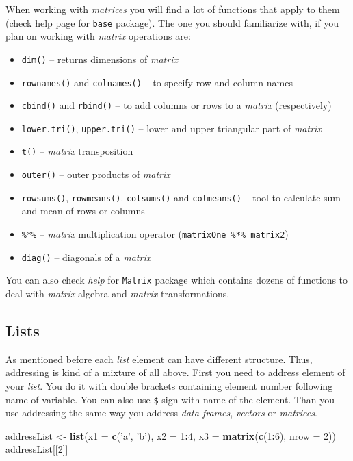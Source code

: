 \documentclass[]{book}
\newenvironment{Shaded}{\begin{snugshade}}{\end{snugshade}}
\newcommand{\KeywordTok}[1]{\textcolor[rgb]{0.13,0.29,0.53}{\textbf{#1}}}
\newcommand{\DataTypeTok}[1]{\textcolor[rgb]{0.13,0.29,0.53}{#1}}
\newcommand{\DecValTok}[1]{\textcolor[rgb]{0.00,0.00,0.81}{#1}}
\newcommand{\StringTok}[1]{\textcolor[rgb]{0.31,0.60,0.02}{#1}}
\newcommand{\OperatorTok}[1]{\textcolor[rgb]{0.81,0.36,0.00}{\textbf{#1}}}
\newcommand{\NormalTok}[1]{#1}
\providecommand{\tightlist}{%
  \setlength{\itemsep}{0pt}\setlength{\parskip}{0pt}}
\theoremstyle{definition}
\theoremstyle{definition}
\theoremstyle{definition}
\theoremstyle{remark}
\begin{document}
When working with \emph{matrices} you will find a lot of functions that
apply to them (check help page for \texttt{base} package). The one you
should familiarize with, if you plan on working with \emph{matrix}
operations are:

\begin{itemize}
\tightlist
\item
  \texttt{dim()} -- returns dimensions of \emph{matrix}
\item
  \texttt{rownames()} and \texttt{colnames()} -- to specify row and
  column names
\item
  \texttt{cbind()} and \texttt{rbind()} -- to add columns or rows to a
  \emph{matrix} (respectively)
\item
  \texttt{lower.tri()}, \texttt{upper.tri()} -- lower and upper
  triangular part of \emph{matrix}
\item
  \texttt{t()} -- \emph{matrix} transposition
\item
  \texttt{outer()} -- outer products of \emph{matrix}
\item
  \texttt{rowsums()}, \texttt{rowmeans()}. \texttt{colsums()} and
  \texttt{colmeans()} -- tool to calculate sum and mean of rows or
  columns
\item
  \texttt{\%*\%} -- \emph{matrix} multiplication operator
  (\texttt{matrixOne\ \%*\%\ matrix2})
\item
  \texttt{diag()} -- diagonals of a \emph{matrix}
\end{itemize}

You can also check \emph{help} for \texttt{Matrix} package which
contains dozens of functions to deal with \emph{matrix} algebra and
\emph{matrix} transformations.

\subsection{Lists}\label{lists}

As mentioned before each \emph{list} element can have different
structure. Thus, addressing is kind of a mixture of all above. First you
need to address element of your \emph{list}. You do it with double
brackets containing element number following name of variable. You can
also use \texttt{\$} sign with name of the element. Than you use
addressing the same way you address \emph{data frames}, \emph{vectors}
or \emph{matrices}.

\begin{Shaded}
\begin{Highlighting}[]
\NormalTok{addressList <-}\StringTok{ }\KeywordTok{list}\NormalTok{(}\DataTypeTok{x1 =} \KeywordTok{c}\NormalTok{(}\StringTok{'a'}\NormalTok{, }\StringTok{'b'}\NormalTok{), }\DataTypeTok{x2 =} \DecValTok{1}\OperatorTok{:}\DecValTok{4}\NormalTok{, }\DataTypeTok{x3 =} \KeywordTok{matrix}\NormalTok{(}\KeywordTok{c}\NormalTok{(}\DecValTok{1}\OperatorTok{:}\DecValTok{6}\NormalTok{), }\DataTypeTok{nrow =} \DecValTok{2}\NormalTok{))}
\NormalTok{addressList[[}\DecValTok{2}\NormalTok{]]}
\end{Highlighting}
\end{Shaded}
\end{document}
